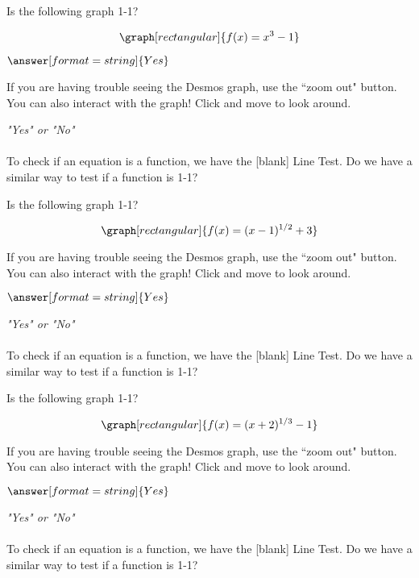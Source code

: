 \documentclass{ximera}
\begin{document}
\begin{question}
Is the following graph 1-1?
 
\[
\graph[rectangular]{f(x) = x^3 - 1}
\]
 
$\answer[format=string]{Yes}$
 
\begin{feedback}
If you are having trouble seeing the Desmos graph, use the ``zoom out" button. You can also interact with the graph! Click and move to look around.
\end{feedback}
 
\begin{hint}
\textit{"Yes" or "No"} \\ \\
To check if an equation is a function, we have the [blank] Line Test. Do we have a similar way to test if a function is 1-1?
\end{hint}
 
\end{question}
 
\begin{question}
Is the following graph 1-1?
 
\[
\graph[rectangular]{f(x) = (x-1)^{1/2}+3}
\]
 
\begin{feedback}
If you are having trouble seeing the Desmos graph, use the ``zoom out" button. You can also interact with the graph! Click and move to look around.
\end{feedback}
 
$\answer[format=string]{Yes}$
\begin{hint}
\textit{"Yes" or "No"} \\ \\
To check if an equation is a function, we have the [blank] Line Test. Do we have a similar way to test if a function is 1-1?
\end{hint}
\end{question}
 
\begin{question}
Is the following graph 1-1?
 
\[
\graph[rectangular]{f(x) = (x+2)^{1/3}-1}
\]
 
\begin{feedback}
If you are having trouble seeing the Desmos graph, use the ``zoom out" button. You can also interact with the graph! Click and move to look around.
\end{feedback}
 
$\answer[format=string]{Yes}$
\begin{hint}
\textit{"Yes" or "No"} \\ \\
To check if an equation is a function, we have the [blank] Line Test. Do we have a similar way to test if a function is 1-1?
\end{hint}
 
\end{question}
 
\end{document}
